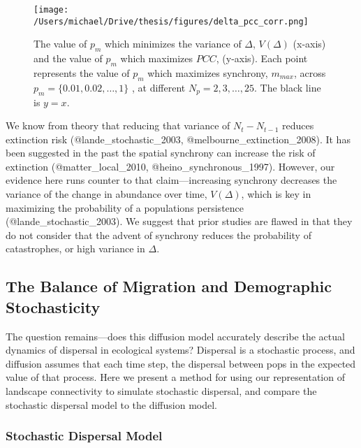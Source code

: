 \begin{figure}[h]

\texttt{[image: /Users/michael/Drive/thesis/figures/delta\_pcc\_corr.png]}

\caption{The value of $p_m$ which minimizes the variance of $\Delta$, $V(\Delta)$ (x-axis) and the value of $p_m$ which maximizes $PCC$, (y-axis). Each point represents the value of $p_m$ which maximizes synchrony, $m_{max}$,  across $p_m = \{0.01, 0.02, \dots, 1\}$ , at different $N_p=2,3,\dots,25$. The black line is $y=x$.}

\label{delta_pcc_corr}

\end{figure}

We know from theory that reducing that variance of \(N_t - N_{t-1}\)
reduces extinction risk (@lande\_stochastic\_2003,
@melbourne\_extinction\_2008). It has been suggested in the past the
spatial synchrony can increase the risk of extinction
(@matter\_local\_2010, @heino\_synchronous\_1997). However, our evidence
here runs counter to that claim---increasing synchrony decreases the
variance of the change in abundance over time, \(V(\Delta)\), which is
key in maximizing the probability of a populations persistence
(@lande\_stochastic\_2003). We suggest that prior studies are flawed in
that they do not consider that the advent of synchrony reduces the
probability of catastrophes, or high variance in \(\Delta\).

\pagebreak

\hypertarget{the-balance-of-migration-and-demographic-stochasticity}{%
\subsection{The Balance of Migration and Demographic
Stochasticity}\label{the-balance-of-migration-and-demographic-stochasticity}}

The question remains---does this diffusion model accurately describe the
actual dynamics of dispersal in ecological systems? Dispersal is a
stochastic process, and diffusion assumes that each time step, the
dispersal between pops in the expected value of that process. Here we
present a method for using our representation of landscape connectivity
to simulate stochastic dispersal, and compare the stochastic dispersal
model to the diffusion model.

\hypertarget{stochastic-dispersal-model}{%
\subsubsection{Stochastic Dispersal
Model}\label{stochastic-dispersal-model}}

